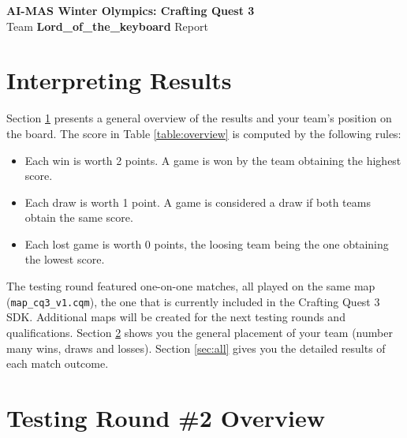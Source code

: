 \documentclass[a4paper,12pt]{article}
\begin{document}
\begin{center}
  {\huge \textbf{AI-MAS Winter Olympics: Crafting Quest 3}} \\
  {\huge Team \textbf{ Lord\_of\_the\_keyboard } Report}
\end{center}


\section{Interpreting Results}
\label{sec:overview}

\par Section \ref{sec:overview} presents a general overview of the
results and your team's position on the board. The score in Table
\ref{table:overview} is computed by the following rules:
\begin{itemize}
\item Each win is worth 2 points. A game is won by the team obtaining
  the highest score.
\item Each draw is worth 1 point. A game is considered a draw if both
  teams obtain the same score.
\item Each lost game is worth 0 points, the loosing team being the one
  obtaining the lowest score.
\end{itemize}

The testing round featured one-on-one matches, all played on the same
map (\verb|map_cq3_v1.cqm|), the one that is currently included in the
Crafting Quest 3 SDK. Additional maps will be created for the next
testing rounds and qualifications.  Section \ref{sec:general} shows
you the general placement of your team (number many wins, draws and
losses).  Section \ref{sec:all} gives you the detailed results of each
match outcome.

\section{Testing Round \#2 Overview}
\label{sec:general}
\end{document}
